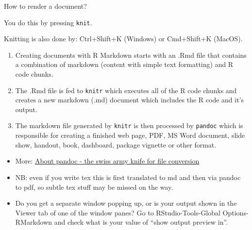 \documentclass[
  10pt,
  ignorenonframetext,
]{beamer}
\begin{document}
\begin{frame}[fragile]
\begin{block}{How to render a document?}
\protect\hypertarget{how-to-render-a-document}{}
\vspace{2mm}

You do this by pressing \texttt{knit}.

Knitting is also done by: Ctrl+Shift+K (Windows) or Cmd+Shift+K (MacOS).

\vspace{2mm}

\begin{enumerate}
[1)]
\item
  Creating documents with R Markdown starts with an .Rmd file that
  contains a combination of markdown (content with simple text
  formatting) and R code chunks.
\item
  The .Rmd file is fed to \texttt{knitr} which executes all of the R
  code chunks and creates a new markdown (.md) document which includes
  the R code and it's output.
\item
  The markdown file generated by \texttt{knitr} is then processed by
  \texttt{pandoc} which is responsible for creating a finished web page,
  PDF, MS Word document, slide show, handout, book, dashboard, package
  vignette or other format.
\end{enumerate}
\end{block}
\end{frame}

\begin{frame}
\begin{itemize}
\item
  More: \href{https://pandoc.org/}{About pandoc - the swiss army knife
  for file conversion}
\item
  NB: even if you write tex this is first translated to md and then via
  pandoc to pdf, so subtle tex stuff may be missed on the way.
\item
  Do you get a separate window popping up, or is your output shown in
  the Viewer tab of one of the window panes? Go to RStudio-Tools-Global
  Options-RMarkdown and check what is your value of ``show output
  preview in''.
\end{itemize}
\end{frame}
\end{document}
